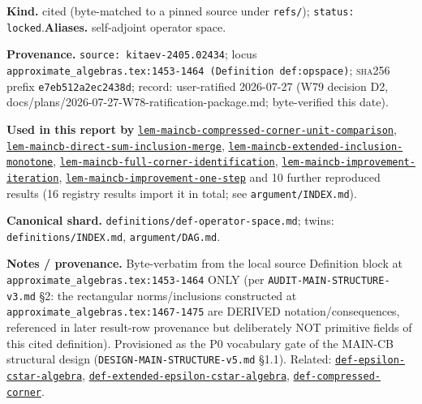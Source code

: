 \begin{defnote}
\textbf{Kind.} cited (byte-matched to a pinned source under \texttt{refs/}); \texttt{status: locked}.\quad\textbf{Aliases.} self-adjoint operator space.
\par
\textbf{Provenance.} \texttt{source: kitaev-\allowbreak{}2405.\allowbreak{}02434}; locus \texttt{approximate\_algebras.\allowbreak{}tex:\allowbreak{}1453-\allowbreak{}1464 (Definition def:\allowbreak{}opspace)}; \textsc{sha256} prefix \texttt{e7eb512a2ec2438d}; record: user-\allowbreak{}ratified 2026-\allowbreak{}07-\allowbreak{}27 (W79 decision D2,\allowbreak{} docs/\allowbreak{}plans/\allowbreak{}2026-\allowbreak{}07-\allowbreak{}27-\allowbreak{}W78-\allowbreak{}ratification-\allowbreak{}package.\allowbreak{}md;\allowbreak{} byte-\allowbreak{}verified this date).
\par
\textbf{Used in this report by} \hyperref[lem:maincb-compressed-corner-unit-comparison]{\texttt{lem-\allowbreak{}maincb-\allowbreak{}compressed-\allowbreak{}corner-\allowbreak{}unit-\allowbreak{}comparison}}, \hyperref[lem:maincb-direct-sum-inclusion-merge]{\texttt{lem-\allowbreak{}maincb-\allowbreak{}direct-\allowbreak{}sum-\allowbreak{}inclusion-\allowbreak{}merge}}, \hyperref[lem:maincb-extended-inclusion-monotone]{\texttt{lem-\allowbreak{}maincb-\allowbreak{}extended-\allowbreak{}inclusion-\allowbreak{}monotone}}, \hyperref[lem:maincb-full-corner-identification]{\texttt{lem-\allowbreak{}maincb-\allowbreak{}full-\allowbreak{}corner-\allowbreak{}identification}}, \hyperref[lem:maincb-improvement-iteration]{\texttt{lem-\allowbreak{}maincb-\allowbreak{}improvement-\allowbreak{}iteration}}, \hyperref[lem:maincb-improvement-one-step]{\texttt{lem-\allowbreak{}maincb-\allowbreak{}improvement-\allowbreak{}one-\allowbreak{}step}} and 10 further reproduced results (16 registry results import it in total; see \texttt{argument/INDEX.md}).
\par
\textbf{Canonical shard.} \texttt{definitions/\allowbreak{}def-\allowbreak{}operator-\allowbreak{}space.\allowbreak{}md}; twins: \texttt{definitions/INDEX.md}, \texttt{argument/DAG.md}.
\par
\textbf{Notes / provenance.} Byte-verbatim from the local source Definition block at
\texttt{approximate\_algebras.\allowbreak{}tex:\allowbreak{}1453-\allowbreak{}1464} ONLY (per \texttt{AUDIT-\allowbreak{}MAIN-\allowbreak{}STRUCTURE-\allowbreak{}v3.\allowbreak{}md} \S{}2:
the rectangular norms/inclusions constructed at \texttt{approximate\_algebras.\allowbreak{}tex:\allowbreak{}1467-\allowbreak{}1475}
are DERIVED notation/consequences, referenced in later result-row provenance but
deliberately NOT primitive fields of this cited definition). Provisioned as the
P0 vocabulary gate of the MAIN-CB structural design
(\texttt{DESIGN-\allowbreak{}MAIN-\allowbreak{}STRUCTURE-\allowbreak{}v5.\allowbreak{}md} \S{}1.1). Related: \hyperref[def:epsilon-cstar-algebra]{\texttt{def-\allowbreak{}epsilon-\allowbreak{}cstar-\allowbreak{}algebra}},
\hyperref[def:extended-epsilon-cstar-algebra]{\texttt{def-\allowbreak{}extended-\allowbreak{}epsilon-\allowbreak{}cstar-\allowbreak{}algebra}}, \hyperref[def:compressed-corner]{\texttt{def-\allowbreak{}compressed-\allowbreak{}corner}}.
\end{defnote}

